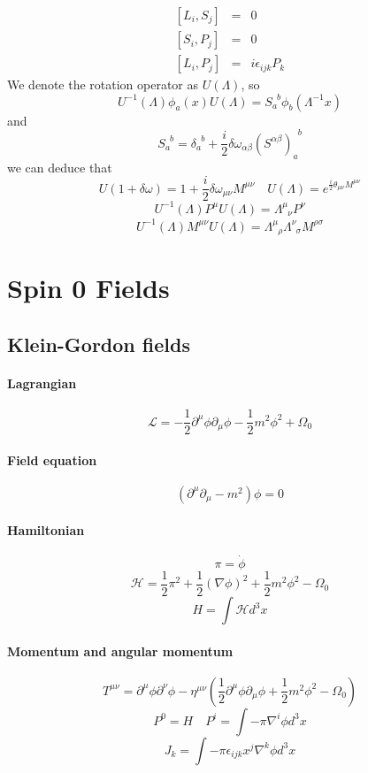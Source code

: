 \documentclass{article}
\begin{document}
\begin{eqnarray}
\left[L_i,S_j\right] &=& 0 \nonumber \\
\left[S_i,P_j\right] &=& 0 \nonumber \\
\left[L_i,P_j\right] &=& i\epsilon_{ijk}P_k \nonumber
\end{eqnarray}
We denote the rotation operator as $U(\Lambda)$, so
\[U^{-1}(\Lambda) \phi_a(x) U(\Lambda) = S_{a}^{\phantom{a}b}\phi_b(\Lambda^{-1}x)\]
and 
\[S_{a}^{\phantom{a}b} = \delta_{a}^{\phantom{a}b}+\frac{i}{2} \delta \omega_{\alpha \beta} (S^{\alpha \beta})_{a}^{\phantom{a}b} \]
we can deduce that
\[U(1+\delta \omega) = 1 + \frac{i}{2} \delta \omega_{\mu \nu} M^{\mu \nu} \quad U(\Lambda) = e^{\frac{i}{2} \theta_{\mu \nu} M^{\mu \nu}}\]
\[U^{-1}(\Lambda) P^{\mu} U(\Lambda) = \Lambda^{\mu}_{\phantom{\mu}\nu} P^{\nu}\]
\[U^{-1}(\Lambda) M^{\mu \nu} U(\Lambda) = \Lambda^{\mu}_{\phantom{\mu}\rho} \Lambda^{\nu}_{\phantom{\nu}\sigma}M^{\rho \sigma}\]

\section{Spin 0 Fields}
\subsection{Klein-Gordon fields}
\paragraph{Lagrangian}
\[\mathcal{L} = -\frac{1}{2} \partial^{\mu} \phi \partial_{\mu} \phi -\frac{1}{2}m^2 \phi^2 + \Omega_0\]
\paragraph{Field equation}
\[(\partial^{\mu} \partial_{\mu} - m^2) \phi = 0\]
\paragraph{Hamiltonian}
\[\pi = \dot{\phi}\]
\[\mathcal{H} = \frac{1}{2} \pi^2 + \frac{1}{2} (\nabla \phi)^2 + \frac{1}{2} m^2 \phi^2-\Omega_0\]
\[H = \int \mathcal{H} d^3 x\]
\paragraph{Momentum and angular momentum}
\[T^{\mu \nu} = \partial^{\mu} \phi \partial^{\nu} \phi - \eta^{\mu \nu}(\frac{1}{2}\partial^{\mu}\phi \partial_{\mu} \phi + \frac{1}{2}m^2 \phi^2 -\Omega_0)\]
\[P^0 = H \quad P^i = \int -\pi \nabla^i \phi d^3 x\]
\[J_k = \int - \pi \epsilon_{ijk} x^{j} \nabla^{k} \phi d^3 x\]
\end{document}
